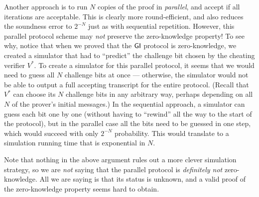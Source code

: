 \documentclass[11pt]{article}
\begin{document}
\begin{enumerate}
  Another approach is to run $N$ copies of the proof in
  \emph{parallel}, and accept if all iterations are acceptable.  This
  is clearly more round-efficient, and also reduces the soundness
  error to $2^{-N}$ just as with sequential repetition.  However, this
  parallel protocol scheme may \emph{not} preserve the zero-knowledge
  property!  To see why, notice that when we proved that the $\mathsf{GI}$
  protocol is zero-knowledge, we created a simulator that had to
  ``predict'' the challenge bit chosen by the cheating verifier
  $V^{*}$.  To create a simulator for this parallel protocol, it seems
  that we would need to guess all $N$ challenge bits at once ---
  otherwise, the simulator would not be able to output a full
  accepting transcript for the entire protocol.  (Recall that $V^{*}$
  can choose its $N$ challenge bits in any arbitrary way, perhaps
  depending on all $N$ of the prover's initial messages.)  In the
  sequential approach, a simulator can guess each bit one by one
  (without having to ``rewind'' all the way to the start of the
  protocol), but in the parallel case all the bits need to be guessed
  in one step, which would succeed with only $2^{-N}$ probability.
  This would translate to a simulation running time that is
  exponential in $N$.

  Note that nothing in the above argument rules out a more clever
  simulation strategy, so we are \emph{not} saying that the parallel
  protocol is \emph{definitely not} zero-knowledge.  All we are saying
  is that its status is unknown, and a valid proof of the
  zero-knowledge property seems hard to obtain.
\end{enumerate}
\end{document}

